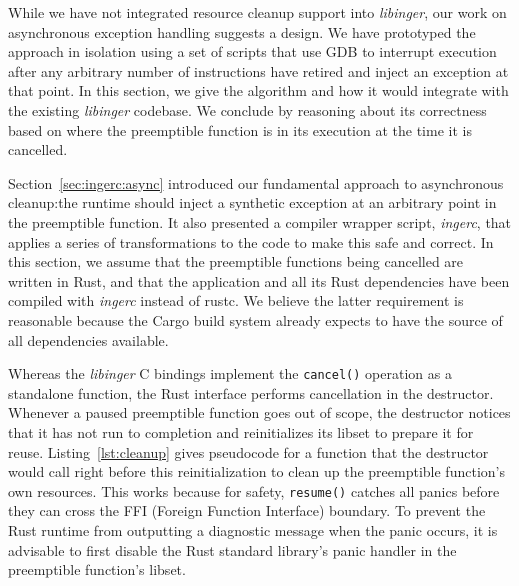 While we have not integrated resource cleanup support into \textit{libinger}, our
work on asynchronous exception handling suggests a design.  We have prototyped the
approach in isolation using a set of scripts that use GDB to interrupt execution
after any arbitrary number of instructions have retired and inject an exception at
that point.  In this section, we give the algorithm and how it would integrate with
the existing \textit{libinger} codebase.  We conclude by reasoning about its
correctness based on where the preemptible function is in its execution at the time
it is cancelled.

Section~\ref{sec:ingerc:async} introduced our fundamental approach to asynchronous
cleanup:\@ the runtime should inject a synthetic exception at an arbitrary point in
the preemptible function.  It also presented a compiler wrapper script,
\textit{ingerc}, that applies a series of transformations to the code to make this
safe and correct.  In this section, we assume that the preemptible functions being
cancelled are written in Rust, and that the application and all its Rust dependencies
have been compiled with \textit{ingerc} instead of rustc.  We believe the latter
requirement is reasonable because the Cargo build system already expects to have the
source of all dependencies available.

Whereas the \textit{libinger} C bindings implement the \texttt{cancel()} operation as
a standalone function, the Rust interface performs cancellation in the destructor.
Whenever a paused preemptible function goes out of scope, the destructor notices that
it has not run to completion and reinitializes its libset to prepare it for reuse.
Listing~\ref{lst:cleanup} gives pseudocode for a function that the destructor would
call right before this reinitialization to clean up the preemptible function's own
resources.  This works because for safety, \texttt{resume()} catches all panics
before they can cross the FFI (Foreign Function Interface) boundary.  To prevent the
Rust runtime from outputting a diagnostic message when the panic occurs, it is
advisable to first disable the Rust standard library's panic handler in the
preemptible function's libset.

